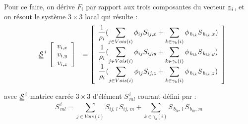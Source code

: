 Pour ce faire, on d\'erive $F_i$ par rapport aux trois composantes du vecteur $\underline{v}_i$,
et on r\'esout le syst\`eme $3\times3$ local qui r\'esulte :\\
\begin{equation}
\begin{array}{lll}
&\displaystyle \underline{\underline{\mathcal{S}}}^{\,i} \,
\left[\begin{array}{c}
v_{i,x} \\ v_{i,y} \\ v_{i,z}
\end{array}\right]
&=\left[\begin{array}{c}
\displaystyle
\frac{1}{\rho_i}(\sum\limits_{j\in Vois(i)}\phi_{ij}S_{ij,x} +\sum\limits_{k\in {\gamma_b(i)}}\phi_{\,b_{ik}}S_{{\,b_{ik}},x})\\
\displaystyle
\frac{1}{\rho_i}(\sum\limits_{j\in Vois(i)}\phi_{ij}S_{ij,y} +\sum\limits_{k\in {\gamma_b(i)}}\phi_{\,b_{ik}}S_{{\,b_{ik}},y})\\
\displaystyle
\frac{1}{\rho_i}(\sum\limits_{j\in Vois(i)}\phi_{ij}S_{ij,z} +\sum\limits_{k\in {\gamma_b(i)}}\phi_{\,b_{ik}}S_{{\,b_{ik}},z}) 
\end{array}\right]
\end{array}
\end{equation}

avec $\underline{\underline{\mathcal{S}}}^{\,i}$ matrice carr\'ee $3\times3$ d'\'el\'ement $S^{\,i}_{\,ml}$ courant d\'efini par :\\
\begin{equation}
S^{\,i}_{\,ml} = \sum\limits_{j\in Vois(i)}S_{ij,\,l}\,S_{ij,\,m} + \sum\limits_{k\in {\gamma_b(i)}}S_{{\,b_{ik}},\,l}\,S_{{\,b_{ik}},\,m}
\end{equation}


